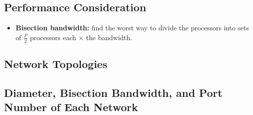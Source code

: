 \documentclass[../main.tex]{subfiles}
\begin{document}


\subsection{Performance Consideration}

\begin{itemize}
	\item \textbf{Bisection bandwidth:} find the worst way to divide the processors into sets of \(\frac{P}{2}\) processors each \(\times\) the bandwidth.
\end{itemize}

\subsection{Network Topologies}

\subsection{Diameter, Bisection Bandwidth, and Port Number of Each Network}

\renewcommand{\arraystretch}{1.5}
\end{document}
